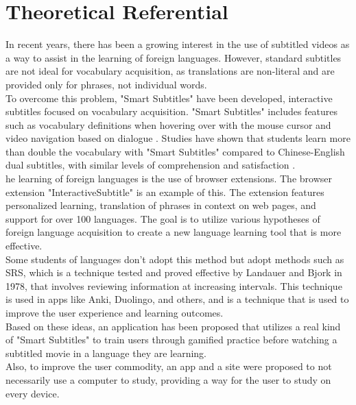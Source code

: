 \documentclass[12pt]{article}
\begin{document}
\section{Theoretical Referential}
In recent years, there has been a growing interest in the use of subtitled videos as a way to assist in the learning of foreign languages. However, standard subtitles are not ideal for vocabulary acquisition, as translations are non-literal and are provided only for phrases, not individual words. \\
To overcome this problem, "Smart Subtitles" have been developed, interactive subtitles focused on vocabulary acquisition. "Smart Subtitles" includes features such as vocabulary definitions when hovering over with the mouse cursor and video navigation based on dialogue \cite{Kovacs13}. Studies have shown that students learn more than double the vocabulary with "Smart Subtitles" compared to Chinese-English dual subtitles, with similar levels of comprehension and satisfaction \cite{Kovacs14}. \\ he learning of foreign languages is the use of browser extensions. The browser extension "InteractiveSubtitle" \cite{ElBatanony21} is an example of this. The extension features personalized learning, translation of phrases in context on web pages, and support for over 100 languages. The goal is to utilize various hypotheses of foreign language acquisition to create a new language learning tool that is more effective. \\ 
Some students of languages don't adopt this method but adopt methods such as SRS, which is a technique tested and proved effective by Landauer and Bjork in 1978, that involves reviewing information at increasing intervals. This technique is used in apps like Anki, Duolingo, and others, and is a technique that is used to improve the user experience and learning outcomes. \\
Based on these ideas, an application has been proposed that utilizes a real kind of "Smart Subtitles" to train users through gamified practice before watching a subtitled movie in a language they are learning.   \\
Also, to improve the user commodity, an app and a site were proposed to not necessarily use a computer to study, providing a way for the user to study on every device. 
\end{document}
